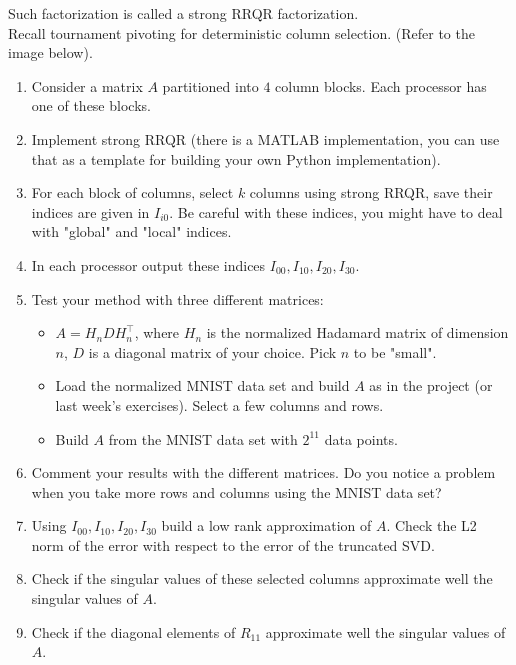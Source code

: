 \documentclass[11pt]{article}
\begin{document}
Such factorization is called a strong RRQR factorization. \\

Recall tournament pivoting for deterministic column selection. (Refer to the image below).

\begin{enumerate}
   \item Consider a matrix $A$ partitioned into $4$ column blocks. Each processor has one of these blocks.
   \item Implement strong RRQR (there is a MATLAB implementation, you can use that as a template for building your own Python implementation). 
   \item For each block of columns, select $k$ columns using strong RRQR, save their indices are given in $I_{i0}$. Be careful with these indices, you might have to deal with "global" and "local" indices.
   \item In each processor output these indices $I_{00}, I_{10}, I_{20}, I_{30}$.
   \item Test your method with three different matrices: 
   \begin{itemize}
       \item $A = H_{n}DH_{n}^{\top}$, where $H_{n}$ is the normalized Hadamard matrix of dimension $n$, $D$ is a diagonal matrix of your choice. Pick $n$ to be "small".
       \item Load the normalized MNIST data set and build $A$ as in the project (or last week's exercises). Select a few columns and rows.
       \item Build $A$ from the MNIST data set with $2^{11}$ data points.
   \end{itemize}
   \item Comment your results with the different matrices. Do you notice a problem when you take more rows and columns using the MNIST data set?
   \item Using $I_{00}, I_{10}, I_{20}, I_{30}$ build a low rank approximation of $A$. Check the L2 norm of the error with respect to the error of the truncated SVD.
   \item Check if the singular values of these selected columns approximate well the singular values of $A$.
   \item Check if the diagonal elements of $R_{11}$ approximate well the singular values of $A$.
\end{enumerate}
\end{document}
